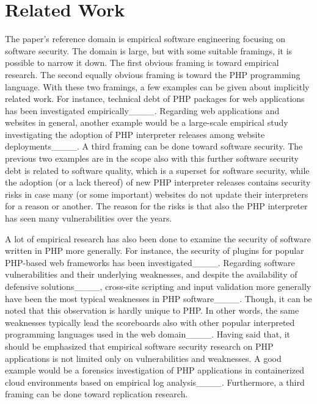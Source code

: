 \section{Related Work}
\label{sec: related work}

The paper's reference domain is empirical software engineering focusing on
software security. The domain is large, but with some suitable framings, it is
possible to narrow it down. The first obvious framing is toward empirical
research. The second equally obvious framing is toward the PHP programming
language. With these two framings, a few examples can be given about implicitly
related work. For instance, technical debt of PHP packages for web applications
has been investigated empirically____. Regarding web
applications and websites in general, another example would be a large-scale
empirical study investigating the adoption of PHP interpreter releases among
website deployments____. A third framing can be done toward
software security. The previous two examples are in the scope also with this
further software security  debt is related to software
quality, which is a superset for software security, while the adoption (or a
lack thereof) of new PHP interpreter releases contains security risks in case
many (or some important) websites do not update their interpreters for a reason
or another. The reason for the risks is that also the PHP interpreter has seen
many vulnerabilities over the years.

A lot of empirical research has also been done to examine the security of
software written in PHP more generally. For instance, the security of plugins
for popular PHP-based web frameworks has been investigated____. Regarding software vulnerabilities and their underlying
weaknesses, and despite the availability of defensive solutions____,
cross-site scripting and input validation more generally have been the most
typical weaknesses in PHP software____. Though, it
can be noted that this observation is hardly unique to PHP. In other words, the
same weaknesses typically lead the scoreboards also with other popular
interpreted programming languages used in the web
domain____. Having said that, it should be emphasized that
empirical software security research on PHP applications is not limited only on
vulnerabilities and weaknesses. A good example would be a forensics
investigation of PHP applications in containerized cloud environments based on
empirical log analysis____. Furthermore, a third framing can be done
toward replication research.

